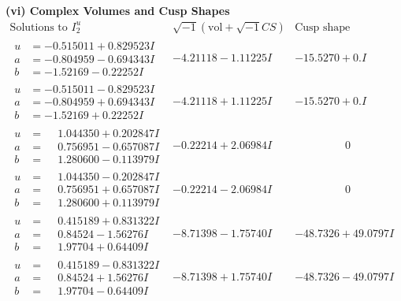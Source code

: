 \documentclass[1p]{elsarticle_modified}
\theoremstyle{definition}
\newcommand{\I}{\sqrt{-1}}
\begin{document}
\newpage\flushleft \textbf{(vi) Complex Volumes and Cusp Shapes}
$$\begin{array}{c|c|c}  
\text{Solutions to }I^u_{2}& \I (\text{vol} + \sqrt{-1}CS) & \text{Cusp shape}\\
 \hline 
\begin{aligned}
u &= -0.515011 + 0.829523 I \\
a &= -0.804959 - 0.694343 I \\
b &= -1.52169 - 0.22252 I\end{aligned}
 & -4.21118 - 1.11225 I & -15.5270 + 0. I\phantom{ +0.000000I} \\ \hline\begin{aligned}
u &= -0.515011 - 0.829523 I \\
a &= -0.804959 + 0.694343 I \\
b &= -1.52169 + 0.22252 I\end{aligned}
 & -4.21118 + 1.11225 I & -15.5270 + 0. I\phantom{ +0.000000I} \\ \hline\begin{aligned}
u &= \phantom{-}1.044350 + 0.202847 I \\
a &= \phantom{-}0.756951 - 0.657087 I \\
b &= \phantom{-}1.280600 - 0.113979 I\end{aligned}
 & -0.22214 + 2.06984 I & \phantom{-0.000000 } 0 \\ \hline\begin{aligned}
u &= \phantom{-}1.044350 - 0.202847 I \\
a &= \phantom{-}0.756951 + 0.657087 I \\
b &= \phantom{-}1.280600 + 0.113979 I\end{aligned}
 & -0.22214 - 2.06984 I & \phantom{-0.000000 } 0 \\ \hline\begin{aligned}
u &= \phantom{-}0.415189 + 0.831322 I \\
a &= \phantom{-}0.84524 - 1.56276 I \\
b &= \phantom{-}1.97704 + 0.64409 I\end{aligned}
 & -8.71398 - 1.75740 I & -48.7326 + 49.0797 I \\ \hline\begin{aligned}
u &= \phantom{-}0.415189 - 0.831322 I \\
a &= \phantom{-}0.84524 + 1.56276 I \\
b &= \phantom{-}1.97704 - 0.64409 I\end{aligned}
 & -8.71398 + 1.75740 I & -48.7326 - 49.0797 I \\ \hline\begin{aligned}

\end{aligned}
\end{array}$$
\end{document}

